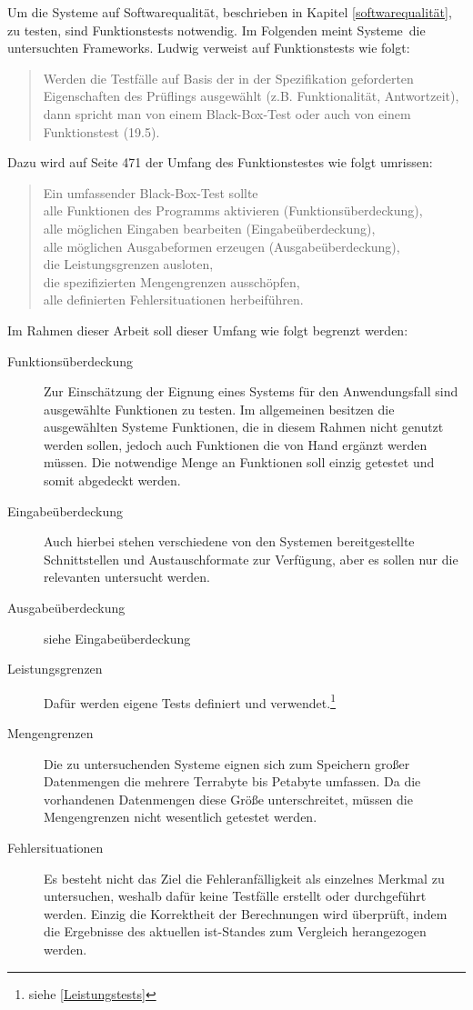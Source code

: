 \label{grundlagen-funktionstests}
Um die Systeme auf Softwarequalität, beschrieben in Kapitel \ref{softwarequalität}, zu testen, sind Funktionstests notwendig.
Im Folgenden meint \glqq Systeme\grqq\ die untersuchten Frameworks.
Ludwig verweist auf Funktionstests wie folgt:
\begin{quote}
Werden die Testfälle auf Basis der in der Spezifikation geforderten Eigenschaften des Prüflings ausgewählt (z.B. Funktionalität, Antwortzeit), dann spricht man von einem Black-Box-Test oder auch von einem Funktionstest (19.5). \cite[S.455]{book:softwareengineering}
\end{quote}
Dazu wird auf Seite 471 der Umfang des Funktionstestes wie folgt umrissen:
\begin{quote}
Ein umfassender Black-Box-Test sollte\\
alle Funktionen des Programms aktivieren (Funktionsüberdeckung),\\
alle möglichen Eingaben bearbeiten (Eingabeüberdeckung),\\
alle möglichen Ausgabeformen erzeugen (Ausgabeüberdeckung),\\
die Leistungsgrenzen ausloten,\\
die spezifizierten Mengengrenzen ausschöpfen,\\
alle definierten Fehlersituationen herbeiführen.
\end{quote}
Im Rahmen dieser Arbeit soll dieser Umfang wie folgt begrenzt werden:
\begin{description}
\item[Funktionsüberdeckung] Zur Einschätzung der Eignung eines Systems für den Anwendungsfall sind ausgewählte Funktionen zu testen. Im allgemeinen besitzen die ausgewählten Systeme Funktionen, die in diesem Rahmen nicht genutzt werden sollen, jedoch auch Funktionen die von Hand ergänzt werden müssen. Die notwendige Menge an Funktionen soll einzig getestet und somit abgedeckt werden.
\item[Eingabeüberdeckung] Auch hierbei stehen verschiedene von den Systemen bereitgestellte Schnittstellen und Austauschformate zur Verfügung, aber es sollen nur die relevanten untersucht werden.
\item[Ausgabeüberdeckung] siehe Eingabeüberdeckung
\item[Leistungsgrenzen] Dafür werden eigene Tests definiert und verwendet.\footnote{siehe \ref{Leistungstests}}
\item[Mengengrenzen] Die zu untersuchenden Systeme eignen sich zum Speichern großer Datenmengen die mehrere Terrabyte bis Petabyte umfassen. Da die vorhandenen Datenmengen diese Größe unterschreitet, müssen die Mengengrenzen nicht wesentlich getestet werden.
\item[Fehlersituationen] Es besteht nicht das Ziel die Fehleranfälligkeit als einzelnes Merkmal zu untersuchen, weshalb dafür keine Testfälle erstellt oder durchgeführt werden. Einzig die Korrektheit der Berechnungen wird überprüft, indem die Ergebnisse des aktuellen ist-Standes zum Vergleich herangezogen werden. 
\end{description}

